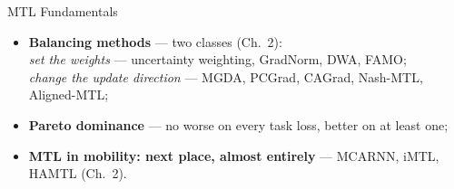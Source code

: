 \documentclass{beamer}
\begin{document}
\begin{frame}{MTL Fundamentals}
\begin{itemize}
        \item \textbf{Balancing methods} --- two classes {\scriptsize(Ch.~2)}:\\
              \textit{set the weights} --- uncertainty weighting, GradNorm, DWA, FAMO;\\
              \textit{change the update direction} --- MGDA, PCGrad, CAGrad, Nash-MTL, Aligned-MTL;
        \item \textbf{Pareto dominance} --- no worse on every task loss, better on at least one;
        \item \textbf{MTL in mobility: next place, almost entirely} --- MCARNN, iMTL, HAMTL {\scriptsize(Ch.~2)}.
    \end{itemize}


\end{frame}
\end{document}
